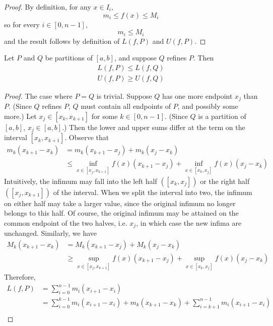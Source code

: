 \begin{proof}
  By definition, for any $x \in I_i$,
  \[
    m_i \leq f(x) \leq M_i 
  \]
  so for every $i \in [0, n - 1]$,
  \[
    m_i \leq M_i
  \]
  and the result follows by definition of $L(f, P)$ and $U(f, P)$.
\end{proof}
\begin{prop}
  \label{prop:lower-upper-sum-refinement}
  Let $P$ and $Q$ be partitions of $[a, b]$, and suppose $Q$ refines $P$. Then 
  \begin{align*}
    L(f, P) \leq L(f, Q) \\
    U(f, P) \geq U(f, Q)
  \end{align*}
\end{prop}
\begin{proof}
  The case where $P = Q$ is trivial. Suppose $Q$ has one more endpoint $x_j$ than $P$. (Since $Q$ refines $P$, $Q$ must contain all endpoints of $P$, and possibly some more.) Let $x_j \in [x_k, x_{k + 1}]$ for some $k \in [0, n - 1]$. (Since $Q$ is a partition of $[a, b]$, $x_j \in [a, b]$.) Then the lower and upper sums differ at the term on the interval $[x_k, x_{k + 1}]$. Observe that
  \begin{align*}
    m_k (x_{k + 1} - x_k) &= m_k (x_{k + 1} - x_j) + m_k (x_j - x_k) \\
    &\leq \inf_{x \in [x_j, x_{k + 1}]} f(x) (x_{k + 1} - x_j) + \inf_{x \in [x_k, x_j]} f(x) (x_j - x_k)
  \end{align*}
  Intuitively, the infimum may fall into the left half $([x_k, x_j])$ or the right half $([x_j, x_{k + 1}])$ of the interval. When we split the interval into two, the infimum on either half may take a larger value, since the original infimum no longer belongs to this half. Of course, the original infimum may be attained on the common endpoint of the two halves, i.e. $x_j$, in which case the new infima are unchanged. Similarly, we have
  \begin{align*}
    M_k (x_{k + 1} - x_k) &= M_k (x_{k + 1} - x_j) + M_k (x_j - x_k) \\
    &\geq \sup_{x \in [x_j, x_{k + 1}]} f(x) (x_{k + 1} - x_j) + \sup_{x \in [x_k, x_j]} f(x) (x_j - x_k)
  \end{align*}
  Therefore,
  \begin{align*}
    L(f, P) &= \sum_{i = 0}^{n - 1} m_i (x_{i + 1} - x_i) \\
    &= \sum_{i = 0}^{k - 1} m_i (x_{i + 1} - x_i) + m_k (x_{k + 1} - x_k) + \sum_{i = k + 1}^{n - 1} m_i (x_{i + 1} - x_i) \\ 

\end{align*}
\end{proof}
